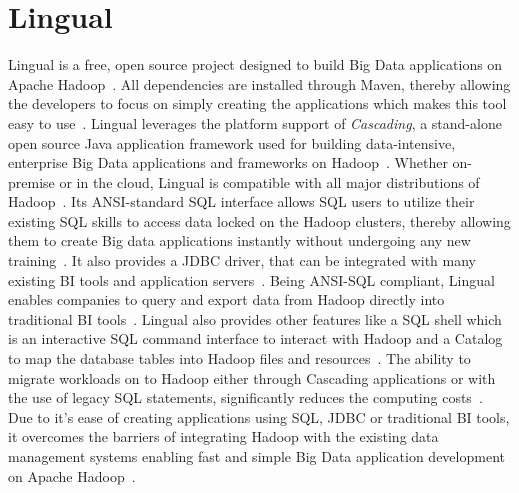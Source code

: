 \section{Lingual}

Lingual is a free, open source project designed to build Big Data applications
on Apache Hadoop~\cite{hid-sp18-516-www-drivenio-lingual}. All dependencies are
installed through Maven, thereby allowing the developers to focus on simply
creating the applications which makes this tool easy to
use~\cite{hid-sp18-516-www-cascading}. Lingual leverages the platform support of
\textit{Cascading}, a stand-alone open source Java application framework used 
for building data-intensive, enterprise Big Data applications and frameworks on 
Hadoop~\cite{hid-sp18-516-www-drivenio-lingual}. Whether on-premise or in the 
cloud, Lingual is compatible with all major distributions of 
Hadoop~\cite{hid-sp18-516-www-drivenio-lingual}. Its ANSI-standard SQL interface 
allows SQL users to utilize their existing SQL skills to access data locked on 
the Hadoop clusters, thereby allowing them to create Big data applications 
instantly without undergoing any new 
training~\cite{hid-sp18-516-www-drivenio-lingual}. It also provides a JDBC
driver, that can be integrated with many existing BI tools and application
servers~\cite{hid-sp18-516-www-cascading}. Being ANSI-SQL compliant, Lingual
enables companies to query and export data from Hadoop directly into traditional
BI tools~\cite{hid-sp18-516-www-cascading}. Lingual also provides other features
like a SQL shell which is an interactive SQL command interface to interact with
Hadoop and a Catalog to map the database tables into Hadoop files and
resources~\cite{hid-sp18-516-www-cascading}. The ability to migrate workloads on
to Hadoop either through Cascading applications or with the use of legacy SQL
statements, significantly reduces the computing
costs~\cite{hid-sp18-516-www-cascading}. Due to it's ease of creating
applications using SQL, JDBC or traditional BI tools, it overcomes the barriers
of integrating Hadoop with the existing data management systems enabling fast
and simple Big Data application development on Apache
Hadoop~\cite{hid-sp18-516-www-drivenio-lingual}.
